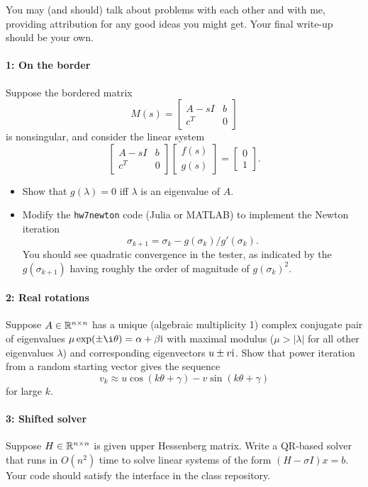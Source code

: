\documentclass[12pt, leqno]{article} %
\begin{document}

You may (and should) talk about problems with each other and with me,
providing attribution for any good ideas you might get.  Your final
write-up should be your own.


\paragraph*{1: On the border}
Suppose the bordered matrix
\[
  M(s) =
  \begin{bmatrix}
    A-s I & b \\
    c^T & 0
  \end{bmatrix}
\]
is nonsingular, and consider the linear system
\[
  \begin{bmatrix} A-s I & b \\ c^T & 0 \end{bmatrix}
  \begin{bmatrix} f(s) \\ g(s) \end{bmatrix} =
  \begin{bmatrix} 0 \\ 1 \end{bmatrix}.
\]
\begin{itemize}
\item
  Show that $g(\lambda) = 0$ iff $\lambda$ is an eigenvalue of $A$.
\item
  Modify the {\tt hw7newton} code (Julia or MATLAB) to implement the
  Newton iteration
  \[
  \sigma_{k+1} = \sigma_k - g(\sigma_k)/g'(\sigma_k).
  \]
  You should see quadratic convergence in the tester, as indicated by
  the $g(\sigma_{k+1})$ having roughly the order of magnitude
  of $g(\sigma_k)^2$.
\end{itemize}

\paragraph*{2: Real rotations}
Suppose $A \in \mathbb{R}^{n \times n}$ has a unique (algebraic multiplicity 1)
complex conjugate pair of eigenvalues $\mu \exp(\pm \i\theta) = \alpha + \beta \iu$ with maximal
modulus ($\mu > |\lambda|$ for all other eigenvalues $\lambda$) and
corresponding eigenvectors $u \pm v \mathrm{i}$.  Show that power iteration
from a random starting vector gives the sequence
\[
  v_k \approx u \cos(k\theta + \gamma) - v \sin(k\theta+\gamma)
\]
for large $k$.

\paragraph*{3: Shifted solver}
Suppose $H \in \mathbb{R}^{n \times n}$ is given upper Hessenberg matrix.
Write a QR-based solver that runs in $O(n^2)$ time to solve linear
systems of the form $(H-\sigma I) x = b$.
Your code should satisfy the interface in the class repository.
\end{document}
